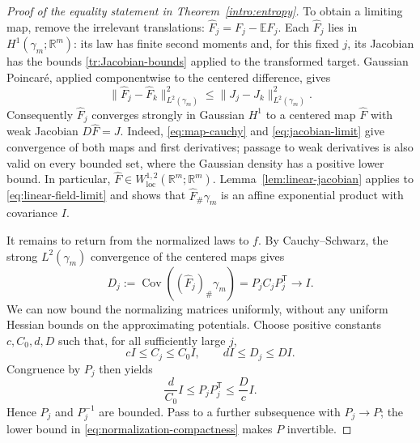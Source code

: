 \documentclass[11pt]{article}
\newcommand{\R}{\mathbb R}
\newcommand{\E}{\mathbb E}
\DeclareMathOperator{\Cov}{Cov}
\newcommand{\norm}[1]{\lVert #1\rVert}
\theoremstyle{definition}
\theoremstyle{remark}
\numberwithin{equation}{section}
\begin{document}
\begin{proof}[Proof of the equality statement in Theorem~\ref{intro:entropy}]
To obtain a limiting map, remove the irrelevant translations:
$\widehat F_j=F_j-\E F_j$.  Each $\widehat F_j$ lies in
$H^1(\gamma_m;\R^m)$: its law has finite second moments and, for this
fixed $j$, its Jacobian has the bounds \eqref{tr:Jacobian-bounds}
applied to the transformed target.  Gaussian Poincar\'e, applied
componentwise to the centered difference, gives
\begin{equation}\label{eq:map-cauchy}
  \norm{\widehat F_j-\widehat F_k}_{L^2(\gamma_m)}^2
    \le \norm{J_j-J_k}_{L^2(\gamma_m)}^2.
\end{equation}
Consequently $\widehat F_j$ converges strongly in Gaussian $H^1$ to a
centered map $\widehat F$ with weak Jacobian $D\widehat F=J$.
Indeed, \eqref{eq:map-cauchy} and \eqref{eq:jacobian-limit} give
convergence of both maps and first derivatives; passage to weak
derivatives is also valid on every bounded set, where the Gaussian
density has a positive lower bound.  In particular,
$\widehat F\in W^{1,2}_{\mathrm{loc}}(\R^m;\R^m)$.
Lemma~\ref{lem:linear-jacobian} applies to \eqref{eq:linear-field-limit}
and shows that $\widehat F_\#\gamma_m$ is an affine exponential product
with covariance $I$.

It remains to return from the normalized laws to $f$.
By Cauchy--Schwarz, the strong $L^2(\gamma_m)$ convergence of the
centered maps gives
\begin{equation}\label{eq:normalized-covariance-limit}
  D_j:=\Cov((\widehat F_j)_\#\gamma_m)
      =P_jC_jP_j^{\mathsf T}\longrightarrow I.
\end{equation}
We can now bound the normalizing matrices uniformly, without any
uniform Hessian bounds on the approximating potentials.
Choose positive constants $c,C_0,d,D$ such that, for all sufficiently
large $j$,
\[
  cI\le C_j\le C_0I,\qquad dI\le D_j\le DI.
\]
Congruence by $P_j$ then yields
\begin{equation}\label{eq:normalization-compactness}
  \frac d{C_0}I\le P_jP_j^{\mathsf T}\le\frac Dc I.
\end{equation}
Hence $P_j$ and $P_j^{-1}$ are bounded.  Pass to a further subsequence
with $P_j\to P$; the lower bound in
\eqref{eq:normalization-compactness} makes $P$ invertible.


\end{proof}
\end{document}
